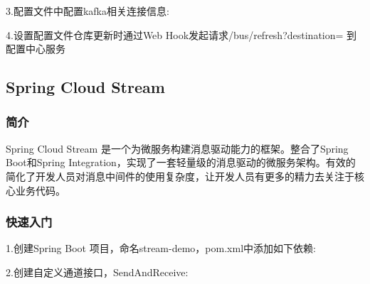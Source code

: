 \documentclass[letterpaper,10pt,english]{sphinxmanual}
\begin{document}
3.配置文件中配置kafka相关连接信息:

4.设置配置文件仓库更新时通过Web Hook发起请求/bus/refresh?destination= 到配置中心服务


\subsection{Spring Cloud Stream}
\label{\detokenize{01.spring-cloud/07.stream/stream:spring-cloud-stream}}\label{\detokenize{01.spring-cloud/07.stream/stream::doc}}

\subsubsection{简介}
\label{\detokenize{01.spring-cloud/07.stream/stream_01:id1}}\label{\detokenize{01.spring-cloud/07.stream/stream_01::doc}}
Spring Cloud Stream 是一个为微服务构建消息驱动能力的框架。整合了Spring Boot和Spring Integration，实现了一套轻量级的消息驱动的微服务架构。有效的简化了开发人员对消息中间件的使用复杂度，让开发人员有更多的精力去关注于核心业务代码。


\subsubsection{快速入门}
\label{\detokenize{01.spring-cloud/07.stream/stream_01:id2}}
1.创建Spring Boot 项目，命名stream-demo，pom.xml中添加如下依赖:

\begin{sphinxVerbatim}[commandchars=\\\{\}]
\end{sphinxVerbatim}

2.创建自定义通道接口，SendAndReceive:
\end{document}
